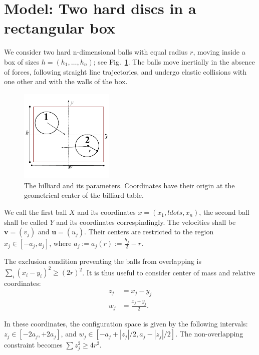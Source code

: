 \documentclass[superscriptaddress,pre,reprint,showpacs,twocolumn]{revtex4-1}
\newcommand{\defeq}{:=}
\begin{document}
\section{Model: Two hard discs in a rectangular box}

We consider two hard n-dimensional balls  with equal radius $r$,
moving inside a box of sizes $h=(h_1, \ldots , h_n )$; see Fig.~\ref{billar01}. 
The balls move inertially in the absence of forces, 
following straight line trajectories,
and undergo elastic collisions with one 
other and with the walls of the box.

\begin{figure}[h]
  \begin{center}
    \includegraphics[width=0.40\textwidth]{figures/DiscsBox01.pdf}
  \end{center}
  \caption{The billiard and its parameters. Coordinates
    have their origin at the geometrical center of the 
    billiard table.}\label{billar01}
\end{figure}


We call the first ball $X$ and its coordinates $ x=(x_1,ldots,x_n)$,
the second ball shall be called $Y$ and its coordinates correspindingly.
The velocities shall be  $\mathbf{v} = (v_j)$ and $\mathbf{u} = (u_j)$. 
Their centers are restricted to the region 
$x_j \in [-a_j,a_j] $, where 
$a_j \defeq a_j(r) \defeq \frac{h_j}{2} - r $.

The exclusion condition preventing the balls from overlapping is $ \sum_i (x_i-y_i)^2  \ge (2r)^2$.
It is thus useful to consider center of mass and relative coordinates:
\begin{equation}\label{cambiocoor01}
 \begin{aligned}
z_j & = x_j -y_j \\
w_j & = \frac{x_j +y_j}{2} .
  \end{aligned}
\end{equation}

In these coordinates, the configuration space is given by the following
intervals:
$z_j \in [-2a_j , +2a_j]$, and
$w_j \in [-a_j + |z_j|/2, a_j - |z_j|/2]$.
The non-overlapping constraint becomes $\sum z_j^2 \ge 4 r^2$.
\end{document}
